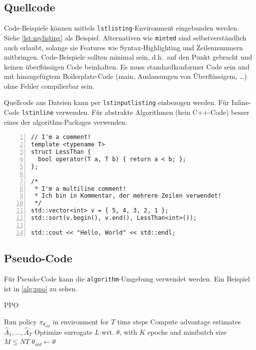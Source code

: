 \documentclass[a4paper,12pt]{llncs}
\numberwithin{equation}{section}
\begin{document}
\subsection{Quellcode}
Code-Beispiele können mittels \texttt{lstlisting}-Environment eingebunden werden.
Siehe \autoref{lst:mylisting} als Beispiel.
Alternativen wie \texttt{minted} sind selbstverständlich auch erlaubt, solange sie Features wie Syntax-Highlighting und Zeilennummern mitbringen.
Code-Beispiele sollten minimal sein, d.h.\ auf den Punkt gebracht und keinen überflüssigen Code beinhalten.
Es muss standardkonformer Code sein und mit hinzugefügtem Boilerplate-Code (main, Auslassungen von Überflüssigem, \dots) ohne Fehler compilierbar sein.

Quellcode aus Dateien kann per \texttt{lstinputlisting} einbezogen werden.
Für Inline-Code \texttt{lstinline} verwenden.
Für abstrakte Algorithmen (kein C++-Code) besser eines der algorithm-Packages verwenden.

\begin{lstlisting}[style=cpp, caption={Example using Lstlisting}, label={lst:mylisting}, numbers=left]
// I'm a comment!
template <typename T>
struct LessThan {
  bool operator(T a, T b) { return a < b; };
};

/*
 * I'm a multiline comment!
 * Ich bin in Kommentar, der mehrere Zeilen verwendet!
 */
std::vector<int> v = { 5, 4, 3, 2, 1 };
std::sort(v.begin(), v.end(), LessThan<int>());

std::cout << "Hello, World" << std::endl;
\end{lstlisting}


\subsection{Pseudo-Code}
Für Pseudo-Code kann die \texttt{algorithm}-Umgebung verwendet werden.
Ein Beispiel ist in \autoref{alg:ppo} zu sehen.
\begin{algorithm}
	\caption{PPO}
	\begin{algorithmic}[htbp]
				\State Run policy $\pi_{\theta_{old}}$ in environment for $T$ time steps
				\State Compute advantage estimates $\hat{A}_{1},\ldots,\hat{A}_{T}$
			\EndFor
			\State Optimize surrogate $L$ wrt. $\theta$, with $K$ epochs and minibatch size $M\leq NT$
			\State $\theta_{old}\leftarrow\theta$
		\EndFor
	\end{algorithmic} 
	\label{alg:ppo}
\end{algorithm}
\end{document}
